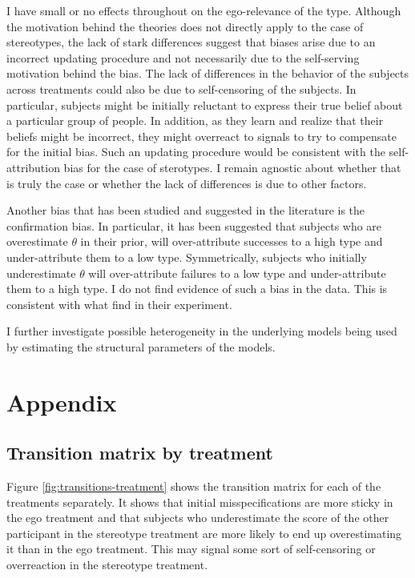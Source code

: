 \documentclass[
  12pt,
]{article}
\begin{document}
I have small or no effects throughout on the ego-relevance of the type.
Although the motivation behind the theories does not directly apply to
the case of stereotypes, the lack of stark differences suggest that
biases arise due to an incorrect updating procedure and not necessarily
due to the self-serving motivation behind the bias. The lack of
differences in the behavior of the subjects across treatments could also
be due to self-censoring of the subjects. In particular, subjects might
be initially reluctant to express their true belief about a particular
group of people. In addition, as they learn and realize that their
beliefs might be incorrect, they might overreact to signals to try to
compensate for the initial bias. Such an updating procedure would be
consistent with the self-attribution bias for the case of sterotypes. I
remain agnostic about whether that is truly the case or whether the lack
of differences is due to other factors.

Another bias that has been studied and suggested in the literature is
the confirmation bias. In particular, it has been suggested that
subjects who are overestimate \(\theta\) in their prior, will
over-attribute successes to a high type and under-attribute them to a
low type. Symmetrically, subjects who initially underestimate \(\theta\)
will over-attribute failures to a low type and under-attribute them to a
high type. I do not find evidence of such a bias in the data. This is
consistent with what \citet{Mobius2022} find in their experiment.

I further investigate possible heterogeneity in the underlying models
being used by estimating the structural parameters of the models.

\hypertarget{appendix}{%
\section{Appendix}\label{appendix}}

\hypertarget{transition-matrix-by-treatment}{%
\subsection{Transition matrix by
treatment}\label{transition-matrix-by-treatment}}

Figure \ref{fig:transitions-treatment} shows the transition matrix for
each of the treatments separately. It shows that initial
misspecifications are more sticky in the ego treatment and that subjects
who underestimate the score of the other participant in the stereotype
treatment are more likely to end up overestimating it than in the ego
treatment. This may signal some sort of self-censoring or overreaction
in the stereotype treatment.
\end{document}
